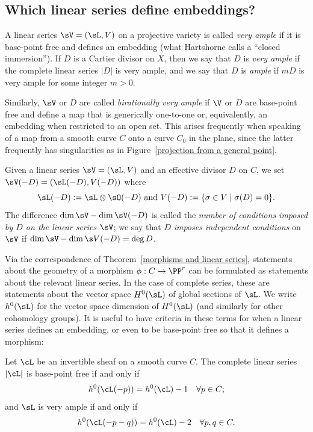 \subsection*{Which linear series define embeddings?}

A linear series $\sV = (\sL, V)$ on a projective variety is called  
\emph{very ample}
%
if it is base-point free and defines an embedding (what Hartshorne
calls a ``closed immersion''). If $D$ is a Cartier divisor on $X$,
then we say that $D$ is \emph{very ample} if the complete linear
series $|D|$ is very ample, and we say that $D$ is 
\emph{ample}
% 
if
$mD$ is very ample for some integer $m>0$.  

Similarly, $\sV$ or $D$ are called 
\emph{birationally very ample}
%
if $\V$ or $D$ are base-point free and define a map that is generically one-to-one or, equivalently,
an embedding when restricted to an open set. This arises frequently when speaking of a map from a smooth
curve $C$ onto a curve $C_{0}$ in the plane, since the latter frequently has singularities as in Figure~\ref{projection from a general point}.

Given a linear series $\sV = (\sL, V)$ and an effective divisor $D$ on $C$, we  set
$
\sV(-D) = (\sL(-D),V(-D))
$
where
$$
\sL(-D): = \sL \otimes \sO(-D)\hbox{ and } V(-D) := \{ \sigma \in V \mid \sigma(D) = 0 \}.
$$
The difference $\dim \sV - \dim \sV(-D)$ is called the \emph{number of conditions imposed by $D$ on the linear series $\sV$}; we say that $D$ \emph{imposes independent conditions} on $\sV$ if $\dim \sV - \dim \s V(-D) = \deg D$.

Via the correspondence of Theorem~\ref{morphisms and linear series}, statements about the geometry of a morphism $\phi : C \to \PP^r$ can be formulated as statements about the relevant linear series. In the case of complete series, these are statements about the vector space $H^{0}(\sL)$ of global sections of $\sL$. We write $h^{0}(\sL)$ for the vector space dimension of $H^0(\sL)$ (and similarly for other cohomology groups). It is useful to have criteria
in these terms for when a linear series defines an embedding, or even to be base-point free so that it
defines a morphism:

\begin{proposition}\label{very ample}
{\rm\cite[Theorem IV.3.1]{Hartshorne1977}}
Let $\cL$ be an invertible sheaf on a smooth curve $C$. The complete linear series $|\cL|$ is base-point free if and only if
$$
h^0(\cL(-p)) = h^0(\cL) - 1 \quad \forall p \in C;
$$
and $\sL$ is very ample if and only if
$$
h^0(\cL(-p-q)) = h^0(\cL) - 2 \quad \forall p, q \in C.
\vspace*{-\parskip}
$$
\end{proposition} 

